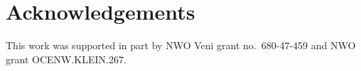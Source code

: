 \documentclass[aos]{imsart}
\theoremstyle{definition}
\numberwithin{equation}{section}
\begin{document}
\section*{Acknowledgements}
This work was supported in part by NWO Veni grant no.~680-47-459 and NWO grant OCENW.KLEIN.267.




\end{document}
